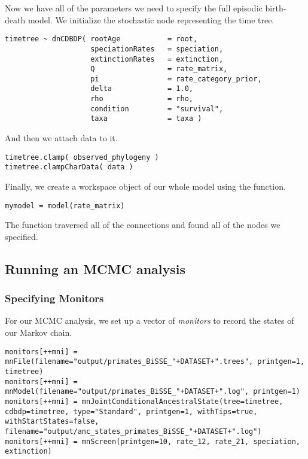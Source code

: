 Now we have all of the parameters we need to specify the full episodic birth-death model. 
We initialize the stochastic node representing the time tree.
{\tt \begin{snugshade*}
\begin{lstlisting}
timetree ~ dnCDBDP( rootAge           = root,
                    speciationRates   = speciation,
                    extinctionRates   = extinction, 
                    Q                 = rate_matrix,
                    pi                = rate_category_prior,
                    delta             = 1.0,
                    rho               = rho,
                    condition         = "survival",
                    taxa              = taxa )
\end{lstlisting}
\end{snugshade*}}
And then we attach data to it.
{\tt \begin{snugshade*}
\begin{lstlisting}
timetree.clamp( observed_phylogeny )
timetree.clampCharData( data )
\end{lstlisting}
\end{snugshade*}}

Finally, we create a workspace object of our whole model using the  function. 
{\tt \begin{snugshade*}
\begin{lstlisting}
mymodel = model(rate_matrix)
\end{lstlisting}
\end{snugshade*}}

The  function traversed all of the connections and found all of the nodes we specified. 


\subsection{Running an MCMC analysis}

\subsubsection{Specifying Monitors}

For our MCMC analysis, we set up a vector of \emph{monitors} to record the states of our Markov chain. 
{\tt \begin{snugshade*}
\begin{lstlisting}
monitors[++mni] = mnFile(filename="output/primates_BiSSE_"+DATASET+".trees", printgen=1, timetree)
monitors[++mni] = mnModel(filename="output/primates_BiSSE_"+DATASET+".log", printgen=1)
monitors[++mni] = mnJointConditionalAncestralState(tree=timetree, cdbdp=timetree, type="Standard", printgen=1, withTips=true, withStartStates=false, filename="output/anc_states_primates_BiSSE_"+DATASET+".log")
monitors[++mni] = mnScreen(printgen=10, rate_12, rate_21, speciation, extinction)
\end{lstlisting}
\end{snugshade*}}

